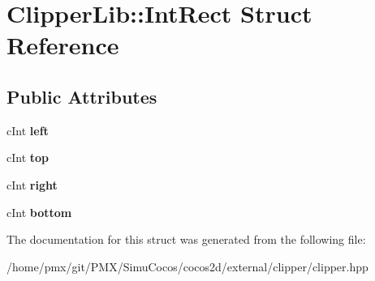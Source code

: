 \hypertarget{structClipperLib_1_1IntRect}{}\section{Clipper\+Lib\+:\+:Int\+Rect Struct Reference}
\label{structClipperLib_1_1IntRect}
\subsection*{Public Attributes}
\begin{DoxyCompactItemize}
\item 
\mbox{\label{structClipperLib_1_1IntRect_a9bf519994ffc7d1d5752fb1e2411b4cd}} 
c\+Int {\bfseries left}
\item 
\mbox{\label{structClipperLib_1_1IntRect_a07154695bf2313182400f829ba07c3a9}} 
c\+Int {\bfseries top}
\item 
\mbox{\label{structClipperLib_1_1IntRect_a28c68b5f806a88a187a53f3956954e74}} 
c\+Int {\bfseries right}
\item 
\mbox{\label{structClipperLib_1_1IntRect_a9da9418de5faa7eba55e8ee98a13ea0e}} 
c\+Int {\bfseries bottom}
\end{DoxyCompactItemize}


The documentation for this struct was generated from the following file\+:\begin{DoxyCompactItemize}
\item 
/home/pmx/git/\+P\+M\+X/\+Simu\+Cocos/cocos2d/external/clipper/clipper.\+hpp\end{DoxyCompactItemize}
